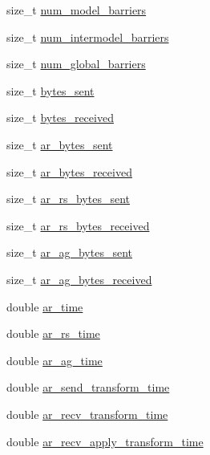 \begin{DoxyCompactItemize}
\item 
size\+\_\+t \hyperlink{classlbann_1_1lbann__comm_aa4f15459eca2a06174a877ba0c23feb7}{num\+\_\+model\+\_\+barriers}
\item 
size\+\_\+t \hyperlink{classlbann_1_1lbann__comm_a03d946ef5ea5d3b15351e78a2eed10fe}{num\+\_\+intermodel\+\_\+barriers}
\item 
size\+\_\+t \hyperlink{classlbann_1_1lbann__comm_a4f01e2f2d8220dc34cf39eb4a255cd7d}{num\+\_\+global\+\_\+barriers}
\item 
size\+\_\+t \hyperlink{classlbann_1_1lbann__comm_ad1f146ae7337ece6266fd307944928e0}{bytes\+\_\+sent}
\item 
size\+\_\+t \hyperlink{classlbann_1_1lbann__comm_afb99f57f7eafc0695bf28e6c26a8120f}{bytes\+\_\+received}
\item 
size\+\_\+t \hyperlink{classlbann_1_1lbann__comm_aa520c16eafde742b70daf60866afc6a8}{ar\+\_\+bytes\+\_\+sent}
\item 
size\+\_\+t \hyperlink{classlbann_1_1lbann__comm_aa5f3c53358bf9002b9fab41918b0c8c1}{ar\+\_\+bytes\+\_\+received}
\item 
size\+\_\+t \hyperlink{classlbann_1_1lbann__comm_ac74bcfb565c1bb6604f336c6d1b647cc}{ar\+\_\+rs\+\_\+bytes\+\_\+sent}
\item 
size\+\_\+t \hyperlink{classlbann_1_1lbann__comm_a2c3e1db0f6d2345748132322b0555db7}{ar\+\_\+rs\+\_\+bytes\+\_\+received}
\item 
size\+\_\+t \hyperlink{classlbann_1_1lbann__comm_a2cfe1264a83865360692c48d7869fe67}{ar\+\_\+ag\+\_\+bytes\+\_\+sent}
\item 
size\+\_\+t \hyperlink{classlbann_1_1lbann__comm_afded6f478dc5021d1edec306dc6c528c}{ar\+\_\+ag\+\_\+bytes\+\_\+received}
\item 
double \hyperlink{classlbann_1_1lbann__comm_aa57d2fbeef85fd8a3c9f2a37ca7687c8}{ar\+\_\+time}
\item 
double \hyperlink{classlbann_1_1lbann__comm_a85022d803e339eb14a15129a07876c2b}{ar\+\_\+rs\+\_\+time}
\item 
double \hyperlink{classlbann_1_1lbann__comm_a48768342eb05c1c6cdaa52c3599b93c8}{ar\+\_\+ag\+\_\+time}
\item 
double \hyperlink{classlbann_1_1lbann__comm_a4e3d35520a8f567579f9235e9808ba1c}{ar\+\_\+send\+\_\+transform\+\_\+time}
\item 
double \hyperlink{classlbann_1_1lbann__comm_adb393f47d60eaa59bace80d2d3dd3bf2}{ar\+\_\+recv\+\_\+transform\+\_\+time}
\item 
double \hyperlink{classlbann_1_1lbann__comm_aa642b0ae2321fa464b0092da527f6375}{ar\+\_\+recv\+\_\+apply\+\_\+transform\+\_\+time}

\end{DoxyCompactItemize}
